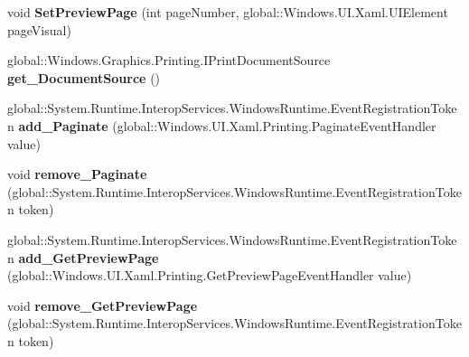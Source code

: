 \begin{DoxyCompactItemize}
void {\bfseries Set\+Preview\+Page} (int page\+Number, global\+::\+Windows.\+U\+I.\+Xaml.\+U\+I\+Element page\+Visual)
\item 
\mbox{\label{interface_windows_1_1_u_i_1_1_xaml_1_1_printing_1_1_i_print_document_a42077e57d55ca55665d043d48da3ec8a}} 
global\+::\+Windows.\+Graphics.\+Printing.\+I\+Print\+Document\+Source {\bfseries get\+\_\+\+Document\+Source} ()
\item 
\mbox{\label{interface_windows_1_1_u_i_1_1_xaml_1_1_printing_1_1_i_print_document_a9dbc873132dc18654e2b7e972080c41e}} 
global\+::\+System.\+Runtime.\+Interop\+Services.\+Windows\+Runtime.\+Event\+Registration\+Token {\bfseries add\+\_\+\+Paginate} (global\+::\+Windows.\+U\+I.\+Xaml.\+Printing.\+Paginate\+Event\+Handler value)
\item 
\mbox{\label{interface_windows_1_1_u_i_1_1_xaml_1_1_printing_1_1_i_print_document_a799ea5a2c39144ec765078426a3efac8}} 
void {\bfseries remove\+\_\+\+Paginate} (global\+::\+System.\+Runtime.\+Interop\+Services.\+Windows\+Runtime.\+Event\+Registration\+Token token)
\item 
\mbox{\label{interface_windows_1_1_u_i_1_1_xaml_1_1_printing_1_1_i_print_document_acb9d671a3b4a58e885771c4ec6c329d5}} 
global\+::\+System.\+Runtime.\+Interop\+Services.\+Windows\+Runtime.\+Event\+Registration\+Token {\bfseries add\+\_\+\+Get\+Preview\+Page} (global\+::\+Windows.\+U\+I.\+Xaml.\+Printing.\+Get\+Preview\+Page\+Event\+Handler value)
\item 
\mbox{\label{interface_windows_1_1_u_i_1_1_xaml_1_1_printing_1_1_i_print_document_aa975f5387eb09201d39628055f1bfb7d}} 
void {\bfseries remove\+\_\+\+Get\+Preview\+Page} (global\+::\+System.\+Runtime.\+Interop\+Services.\+Windows\+Runtime.\+Event\+Registration\+Token token)
\item 
\mbox{\label{interface_windows_1_1_u_i_1_1_xaml_1_1_printing_1_1_i_print_document_a6a0ff286beb8ddcdbe12d51a49010b97}} 

\end{DoxyCompactItemize}
